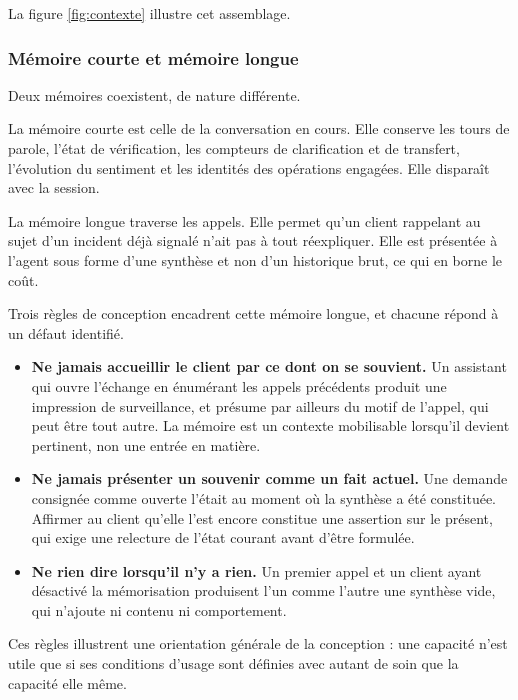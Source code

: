 La figure \ref{fig:contexte} illustre cet assemblage.


\subsubsection{Mémoire courte et mémoire longue}

Deux mémoires coexistent, de nature différente.

La mémoire courte est celle de la conversation en cours. Elle conserve les tours de parole, l'état de vérification, les compteurs de clarification et de transfert, l'évolution du sentiment et les identités des opérations engagées. Elle disparaît avec la session.

La mémoire longue traverse les appels. Elle permet qu'un client rappelant au sujet d'un incident déjà signalé n'ait pas à tout réexpliquer. Elle est présentée à l'agent sous forme d'une synthèse et non d'un historique brut, ce qui en borne le coût.

Trois règles de conception encadrent cette mémoire longue, et chacune répond à un défaut identifié.

\begin{itemize}
  \item \textbf{Ne jamais accueillir le client par ce dont on se souvient.} Un assistant qui ouvre l'échange en énumérant les appels précédents produit une impression de surveillance, et présume par ailleurs du motif de l'appel, qui peut être tout autre. La mémoire est un contexte mobilisable lorsqu'il devient pertinent, non une entrée en matière.
  \item \textbf{Ne jamais présenter un souvenir comme un fait actuel.} Une demande consignée comme ouverte l'était au moment où la synthèse a été constituée. Affirmer au client qu'elle l'est encore constitue une assertion sur le présent, qui exige une relecture de l'état courant avant d'être formulée.
  \item \textbf{Ne rien dire lorsqu'il n'y a rien.} Un premier appel et un client ayant désactivé la mémorisation produisent l'un comme l'autre une synthèse vide, qui n'ajoute ni contenu ni comportement.
\end{itemize}

Ces règles illustrent une orientation générale de la conception : une capacité n'est utile que si ses conditions d'usage sont définies avec autant de soin que la capacité elle même.

